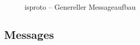 \begin{figure}[tbh]
\begin{centering}

\begin{bytefield}[bitwidth=3em]{8}
	\\
	 \\
	
	 \\
	\skippedwords \\
	 \\
	
	 \\
	\skippedwords \\
	
\end{bytefield}

\par\end{centering}
\protect\caption{\gls*{isproto} -- Genereller Messageaufbau}
\end{figure}

\subsection{Messages}

